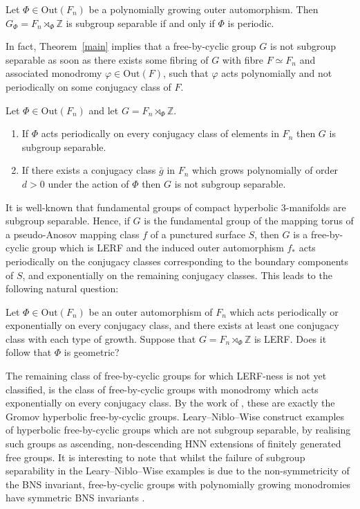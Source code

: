 \begin{thmx}\label{main}
Let $\Phi \in \mathrm{Out}(F_n)$ be a polynomially growing outer automorphism. Then $G_{\Phi} = F_n \rtimes_{\Phi} \mathbb{Z}$ is subgroup separable if and only if $\Phi$ is periodic.
\end{thmx}

In fact, Theorem~\ref{main} implies that a free-by-cyclic group $G$ is not subgroup separable as soon as there exists some fibring of $G$ with fibre $F \simeq F_n$ and associated monodromy $\varphi \in \mathrm{Out}(F)$, such that $\varphi$ acts polynomially and not periodically on some conjugacy class of $F$.
\begin{corx}\label{cor}
Let $\Phi \in \mathrm{Out}(F_n)$ and let $G = F_n \rtimes_{\Phi} \mathbb{Z}$. \begin{enumerate}
    \item If $\Phi$ acts periodically on every conjugacy class of elements in $F_n$ then $G$ is subgroup separable.
    \item  If there exists a conjugacy class $\bar{g}$ in $F_n$ which grows polynomially of order $d > 0$ under the action of $\Phi$ then $G$ is not subgroup separable.
\end{enumerate}
\end{corx}

It is well-known that fundamental groups of compact hyperbolic 3-manifolds are subgroup separable. Hence, if $G$ is the fundamental group of the mapping torus of a pseudo-Anosov mapping class $f$ of a punctured surface $S$, then $G$ is a free-by-cyclic group which is LERF and the induced outer automorphism $f_{*}$ acts periodically on the conjugacy classes corresponding to the boundary components of $S$, and exponentially on the remaining conjugacy classes. This leads to the  following natural question:

\begin{question}\label{qn}
Let $\Phi \in \mathrm{Out}(F_n)$ be an outer automorphism of $F_n$ which acts periodically or exponentially on every conjugacy class, and there exists at least one conjugacy class with each type of growth. Suppose that $G = F_n \rtimes_{\Phi} \mathbb{Z}$ is LERF. Does it follow that $\Phi$ is geometric?
\end{question}

The remaining class of free-by-cyclic groups for which LERF-ness is not yet classified, is the class of free-by-cyclic groups with monodromy which acts exponentially on every conjugacy class. By the work of \cite{DL}, these are exactly the Gromov hyperbolic free-by-cyclic groups. Leary--Niblo--Wise  \cite{LNW} construct examples of hyperbolic free-by-cyclic groups which are not subgroup separable, by realising such groups as ascending, non-descending HNN extensions of finitely generated free groups. It is interesting to note that whilst the failure of subgroup separability in the Leary--Niblo--Wise examples is due to the non-symmetricity of the BNS invariant, free-by-cyclic groups with polynomially growing monodromies have symmetric BNS invariants \cite{CashenLevitt2016}.

